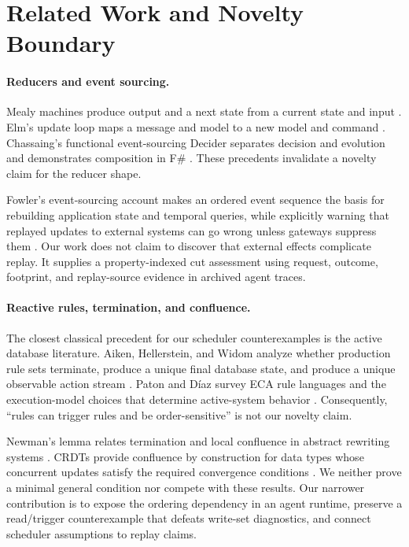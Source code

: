 \section{Related Work and Novelty Boundary}
\label{sec:related}

\paragraph{Reducers and event sourcing.}
Mealy machines produce output and a next state from a current state and input
\cite{mealy1955method}.  Elm's update loop maps a message and model to a new
model and command \cite{elmarchitecture}.  Chassaing's functional
event-sourcing Decider separates decision and evolution and demonstrates
composition in F\# \cite{chassaing2021decider}.  These precedents invalidate a
novelty claim for the reducer shape.

Fowler's event-sourcing account makes an ordered event sequence the basis for
rebuilding application state and temporal queries, while explicitly warning
that replayed updates to external systems can go wrong unless gateways suppress
them \cite{fowler2005eventsourcing}.  Our work does not claim to discover that
external effects complicate replay.  It supplies a property-indexed cut
assessment using request, outcome, footprint, and replay-source evidence in
archived agent traces.

\paragraph{Reactive rules, termination, and confluence.}
The closest classical precedent for our scheduler counterexamples is the active
database literature.  Aiken, Hellerstein, and Widom analyze whether production
rule sets terminate, produce a unique final database state, and produce a unique
observable action stream \cite{aiken1995static}.  Paton and D\'{i}az survey ECA
rule languages and the execution-model choices that determine active-system
behavior \cite{paton1999active}.  Consequently, ``rules can trigger rules and
be order-sensitive'' is not our novelty claim.

Newman's lemma relates termination and local confluence in abstract rewriting
systems \cite{newman1942}.  CRDTs provide confluence by construction for data
types whose concurrent updates satisfy the required convergence conditions
\cite{shapiro2011crdt}.  We neither prove a minimal general condition nor
compete with these results.  Our narrower contribution is to expose the
ordering dependency in an agent runtime, preserve a read/trigger counterexample
that defeats write-set diagnostics, and connect scheduler assumptions to replay
claims.

